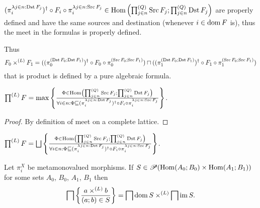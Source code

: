 \begin{rem}
  $(\pi^{\lambda j \in n : \operatorname{Dst} F_j}_i)^{\dagger} \circ F_i \circ
  \pi^{\lambda j \in n : \operatorname{Src} F_j}_i \in \operatorname{Hom} \left(
  \prod^{(Q)}_{j \in n} \operatorname{Src} F_j ; \prod^{(Q)}_{j \in n} \operatorname{Dst} F_j
  \right)$ are properly defined and have the same sources and destination
  (whenever $i \in \operatorname{dom} F$ is), thus the meet in the formulas is
  properly defined.
\end{rem}

\begin{rem}
  Thus
  \[ F_0 \times^{(L)} F_1 = ((\pi^{(\operatorname{Dst} F_0 ; \operatorname{Dst}
     F_1)}_0)^{\dagger} \circ F_0 \circ \pi^{(\operatorname{Src} F_0 ; \operatorname{Src}
     F_1)}_0) \sqcap ((\pi^{(\operatorname{Dst} F_0 ; \operatorname{Dst} F_1)}_1)^{\dagger}
     \circ F_1 \circ \pi^{(\operatorname{Src} F_0 ; \operatorname{Src} F_1)}_1) \]
  that is product is defined by a pure algebraic formula.
\end{rem}

\begin{prop}
  $\prod^{(L)} F = \max \left\{ \frac{ \Phi \in \operatorname{Hom} \left( \prod^{(Q)}_{j \in
  n} \operatorname{Src} F_j ; \prod^{(Q)}_{j \in n} \operatorname{Dst} F_j \right)
  }{ \forall i \in n : \Phi \sqsubseteq (\pi^{\lambda
  j \in n : \operatorname{Dst} F_j}_i)^{\dagger} \circ F_i \circ \pi^{\lambda j \in n
  : \operatorname{Src} F_j}_i }\right\}$.
\end{prop}

\begin{proof}
  By definition of meet on a complete lattice.
\end{proof}

\begin{cor}
  $\prod^{(L)} F = \bigsqcup \setcond{ \Phi \in \Hom \left( \prod^{(Q)}_{j
  \in n} \Src F_j ; \prod^{(Q)}_{j \in n} \Dst F_j \right)
  }{ \forall i \in n : \Phi \sqsubseteq (\pi^{\lambda
  j \in n : \Dst F_j}_i)^{\dagger} \circ F_i \circ \pi^{\lambda j \in n
  : \Src F_j}_i }$.
\end{cor}

\begin{thm}
  Let $\pi^X_i$ be metamonovalued morphisms. If $S \in \mathscr{P} (\operatorname{Hom}
  (A_0 ; B_0) \times \operatorname{Hom} (A_1 ; B_1))$ for some sets $A_0$, $B_0$,
  $A_1$, $B_1$ then
  \[ \bigsqcap \left\{ \frac{ a \times^{(L)} b }{(a ; b)\in S }\right\} =
     \bigsqcap \operatorname{dom} S \times^{(L)} \bigsqcap \operatorname{im} S. \]
\end{thm}

